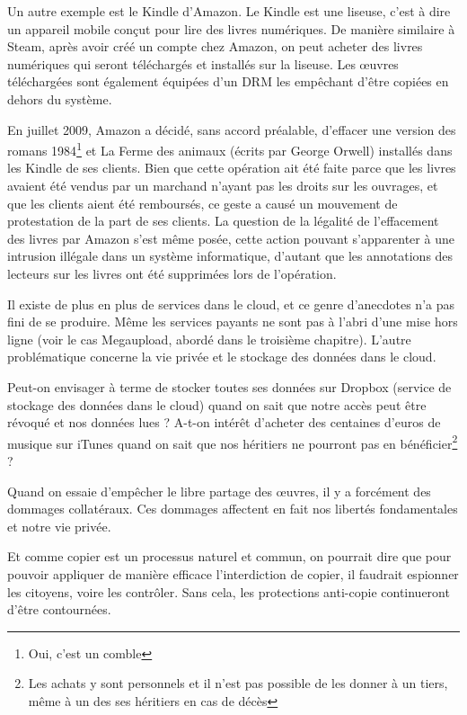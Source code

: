 Un autre exemple est le Kindle d'Amazon.
Le Kindle est une liseuse, c'est à dire un appareil mobile conçut pour lire des livres numériques.
De manière similaire à Steam, après avoir créé un compte chez Amazon, on peut acheter des livres numériques qui seront téléchargés et installés sur la liseuse.
Les œuvres téléchargées sont également équipées d'un DRM les empêchant d'être copiées en dehors du système.

En juillet 2009, Amazon a décidé, sans accord préalable, d'effacer une version des romans 1984\footnote{Oui, c'est un comble} et La Ferme des animaux (écrits par George Orwell) installés dans les Kindle de ses clients.
Bien que cette opération ait été faite parce que les livres avaient été vendus par un marchand n'ayant pas les droits sur les ouvrages, et que les clients aient été remboursés, ce geste a causé un mouvement de protestation de la part de ses clients.
La question de la légalité de l'effacement des livres par Amazon s'est même posée, cette action pouvant s'apparenter à une intrusion illégale dans un système informatique, d'autant que les annotations des lecteurs sur les livres ont été supprimées lors de l'opération.

Il existe de plus en plus de services dans le cloud, et ce genre d'anecdotes n'a pas fini de se produire.
Même les services payants ne sont pas à l'abri d'une mise hors ligne (voir le cas Megaupload, abordé dans le troisième chapitre).
L'autre problématique concerne la vie privée et le stockage des données dans le cloud.

Peut-on envisager à terme de stocker toutes ses données sur Dropbox (service de stockage des données dans le cloud) quand on sait que notre accès peut être révoqué et nos données lues ?
A-t-on intérêt d'acheter des centaines d'euros de musique sur iTunes quand on sait que nos héritiers ne pourront pas en bénéficier\footnote{Les achats y sont personnels et il n'est pas possible de les donner à un tiers, même à un des ses héritiers en cas de décès} ?

Quand on essaie d'empêcher le libre partage des œuvres, il y a forcément des dommages collatéraux.
Ces dommages affectent en fait nos libertés fondamentales et notre vie privée.

Et comme copier est un processus naturel et commun, on pourrait dire que pour pouvoir appliquer de manière efficace l'interdiction de copier, il faudrait espionner les citoyens, voire les contrôler.
Sans cela, les protections anti-copie continueront d'être contournées.

